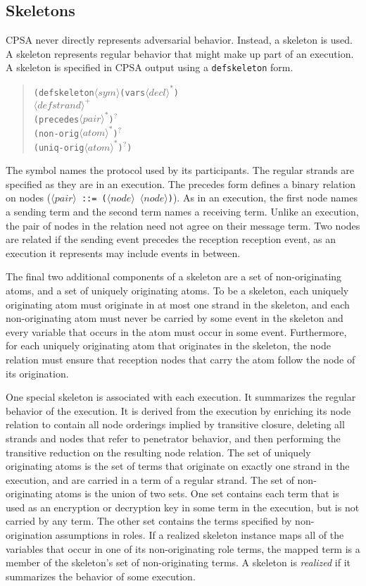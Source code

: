 \documentclass[titlepage,12pt]{article}
\theoremstyle{definition}
\newcommand{\nterm}[1]{\ensuremath{\langle\mathit{#1}\rangle}}
\newcommand{\nterms}[1]{\ensuremath{\nterm{#1}^\ast}}
\newcommand{\ntermp}[1]{\ensuremath{\nterm{#1}^+}}
\newcommand{\ntermo}[1]{#1$^?$}
\begin{document}
\subsection{Skeletons}

CPSA never directly represents adversarial behavior.  Instead, a
skeleton is used.  A skeleton represents regular behavior that might
make up part of an execution. A skeleton is specified in CPSA output using a
\texttt{defskeleton} form.
\begin{quote}
\begin{alltt}
(defskeleton \nterm{sym} (vars \nterms{decl})
\quad \ntermp{defstrand}
\quad \ntermo{(precedes \nterms{pair})}
\quad \ntermo{(non-orig \nterms{atom})}
\quad \ntermo{(uniq-orig \nterms{atom})})
\end{alltt}
\end{quote}
The symbol names the protocol used by its participants.  The regular
strands are specified as they are in an execution.  The precedes form
defines a binary relation on nodes (\texttt{\nterm{pair} ::=
  (\nterm{node} \nterm{node})}).  As in an execution, the first node
names a sending term and the second term names a receiving term.
Unlike an execution, the pair of nodes in the relation need not agree
on their message term.  Two nodes are related if the sending event
precedes the reception reception event, as an execution it represents
may include events in between.

The final two additional components of a skeleton are a set of
non-originating atoms, and a set of uniquely originating atoms.  To be
a skeleton, each uniquely originating atom must originate in at
most one strand in the skeleton, and each non-originating atom must
never be carried by some event in the skeleton and every
variable that occurs in the atom must occur in some event.
Furthermore, for each uniquely originating atom that originates in the
skeleton, the node relation must ensure that reception nodes that
carry the atom follow the node of its origination.

One special skeleton is associated with each execution.  It summarizes
the regular behavior of the execution.  It is derived from the
execution by enriching its node relation to contain all node orderings
implied by transitive closure, deleting all strands and nodes that
refer to penetrator behavior, and then performing the transitive
reduction on the resulting node relation.  The set of uniquely
originating atoms is the set of terms that originate on exactly one
strand in the execution, and are carried in a term of a regular
strand.  The set of non-originating atoms is the union of two sets.
One set contains each term that is used as an encryption or decryption
key in some term in the execution, but is not carried by any term.
The other set contains the terms specified by non-origination
assumptions in roles.  If a realized skeleton instance maps all of the
variables that occur in one of its non-originating role terms, the
mapped term is a member of the skeleton's set of non-originating
terms.  A skeleton is \emph{realized} if it summarizes the behavior of
some execution.
\end{document}
